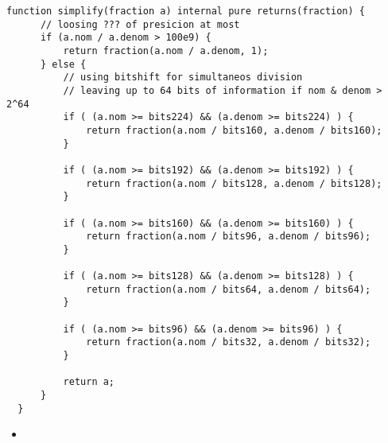 \begin{lstlisting}[firstnumber=69]
  function simplify(fraction a) internal pure returns(fraction) {
      // loosing ??? of presicion at most
      if (a.nom / a.denom > 100e9) {
          return fraction(a.nom / a.denom, 1);
      } else {
          // using bitshift for simultaneos division
          // leaving up to 64 bits of information if nom & denom > 2^64
          if ( (a.nom >= bits224) && (a.denom >= bits224) ) {
              return fraction(a.nom / bits160, a.denom / bits160);
          }

          if ( (a.nom >= bits192) && (a.denom >= bits192) ) {
              return fraction(a.nom / bits128, a.denom / bits128);
          }

          if ( (a.nom >= bits160) && (a.denom >= bits160) ) {
              return fraction(a.nom / bits96, a.denom / bits96);
          }

          if ( (a.nom >= bits128) && (a.denom >= bits128) ) {
              return fraction(a.nom / bits64, a.denom / bits64);
          }

          if ( (a.nom >= bits96) && (a.denom >= bits96) ) {
              return fraction(a.nom / bits32, a.denom / bits32);
          }

          return a;
      }
  }
\end{lstlisting}

\noindent\begin{itemize}
  \item {}
\end{itemize}

